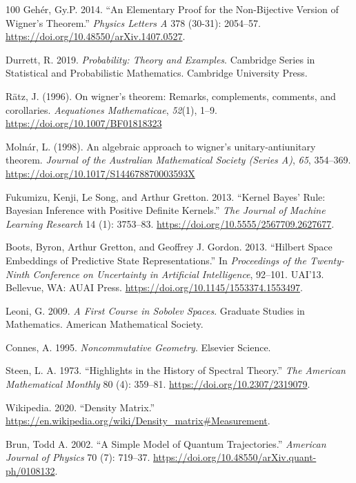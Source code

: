 \documentclass[11pt]{book}
\begin{document}
\begin{thebibliography}{100}
 Gehér, Gy.P. 2014. {``An Elementary Proof for the Non-Bijective Version
of Wigner's Theorem.''} \emph{Physics Letters A} 378 (30-31): 2054--57.
\url{https://doi.org/10.48550/arXiv.1407.0527}.

 Durrett, R. 2019. \emph{Probability: Theory and Examples}. Cambridge
Series in Statistical and Probabilistic Mathematics. Cambridge
University Press.

 Rätz, J. (1996). On wigner's theorem: Remarks, complements, comments,
and corollaries. \emph{Aequationes Mathematicae}, \emph{52}(1), 1--9.
\url{https://doi.org/10.1007/BF01818323}

 Molnár, L. (1998). An algebraic approach to wigner's unitary-antiunitary
theorem. \emph{Journal of the Australian Mathematical Society (Series
A)}, \emph{65}, 354--369.
\url{https://doi.org/10.1017/S144678870003593X}

 Fukumizu, Kenji, Le Song, and Arthur Gretton. 2013. {``Kernel Bayes'
Rule: Bayesian Inference with Positive Definite Kernels.''} \emph{The
Journal of Machine Learning Research} 14 (1): 3753--83.
\url{https://doi.org/10.5555/2567709.2627677}.

 Boots, Byron, Arthur Gretton, and Geoffrey J. Gordon. 2013. {``Hilbert
Space Embeddings of Predictive State Representations.''} In
\emph{Proceedings of the Twenty-Ninth Conference on Uncertainty in
Artificial Intelligence}, 92--101. UAI'13. Bellevue, WA: AUAI Press.
\url{https://doi.org/10.1145/1553374.1553497}.

 Leoni, G. 2009. \emph{A First Course in Sobolev Spaces}. Graduate
Studies in Mathematics. American Mathematical Society.

 Connes, A. 1995. \emph{Noncommutative Geometry}. Elsevier Science.

 Steen, L. A. 1973. {``Highlights in the History of Spectral Theory.''}
\emph{The American Mathematical Monthly} 80 (4): 359--81.
\url{https://doi.org/10.2307/2319079}.

 Wikipedia. 2020. {``Density Matrix.''}
\url{https://en.wikipedia.org/wiki/Density_matrix\#Measurement}.

 Brun, Todd A. 2002. {``A Simple Model of Quantum Trajectories.''}
\emph{American Journal of Physics} 70 (7): 719--37.
\url{https://doi.org/10.48550/arXiv.quant-ph/0108132}.


\end{thebibliography}
\end{document}
